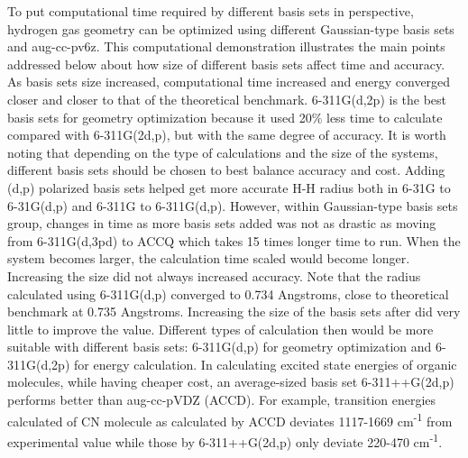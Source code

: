\documentclass[
journal=jpcbfk, %
manuscript=article]{achemso}
\begin{document}
	To put computational time required by different basis sets in perspective, hydrogen gas geometry can be optimized using different Gaussian-type basis sets and aug-cc-pv6z. This computational demonstration illustrates the main points addressed below about how size of different basis sets affect time and accuracy. As basis sets size increased, computational time increased and energy converged closer and closer to that of the theoretical benchmark.  6-311G(d,2p) is the best basis sets for geometry optimization because it used 20\% less time to calculate compared with 6-311G(2d,p), but with the same degree of accuracy. It is worth noting that depending on the type of calculations and the size of the systems, different basis sets should be chosen to best balance accuracy and cost.
	Adding (d,p) polarized basis sets helped get more accurate H-H radius both in 6-31G to 6-31G(d,p) and 6-311G to 6-311G(d,p). However, within Gaussian-type basis sets group, changes in time as more basis sets added was not as drastic as moving from 6-311G(d,3pd) to ACCQ which takes 15 times longer time to run. When the system becomes larger, the calculation time scaled would become longer. Increasing the size did not always increased accuracy. Note that the radius calculated using 6-311G(d,p) converged to 0.734 Angstroms, close to theoretical benchmark at 0.735 Angstroms. Increasing the size of the basis sets after did very little to improve the value. Different types of calculation then would be more suitable with different basis sets: 6-311G(d,p) for geometry optimization and 6-311G(d,2p) for energy calculation. In calculating excited state energies of organic molecules\cite{Wiberg2004,Barnes2014}, while having cheaper cost, an average-sized basis set 6-311++G(2d,p)\cite{Feller1996} performs better than aug-cc-pVDZ (ACCD)\cite{Feller1996}. For example, transition energies calculated of CN molecule as calculated by ACCD deviates 1117-1669 cm\textsuperscript{-1} from experimental value while those by 6-311++G(2d,p) only deviate 220-470 cm\textsuperscript{-1}.\cite{Barnes2014}
	
\end{document}
